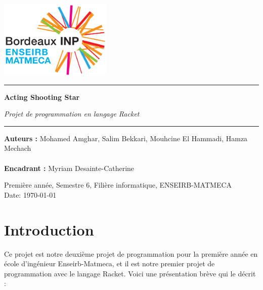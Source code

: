 \documentclass[a4paper]{article}
\begin{document}
\label{sec:title}
\thispagestyle{empty}

\noindent
\includegraphics[width=0.4\textwidth]{Pictures/ENSEIRB.png}




\noindent\rule{\textwidth}{1pt}
\begin{flushright}
  \Huge
  \textbf{ Acting Shooting Star }


  \large 
  \textsl{Projet de programmation en langage Racket}

\end{flushright}
\noindent\rule{\textwidth}{1pt}


\large
\noindent\textbf{Auteurs  : } \textup{Mohamed Amghar, Salim Bekkari, Mouhcine  El Hammadi, Hamza Mechach}\\ \\
\noindent\textbf{Encadrant :} \textup{Myriam Desainte-Catherine}


\normalsize





\begin{center}
  Première année, Semestre 6, Filière informatique, ENSEIRB-MATMECA\\
  Date: \today
\end{center}




\newpage
\tableofcontents
\pagebreak

\section{Introduction}
Ce projet est notre deuxième projet de programmation pour la première année en école d'ingénieur Enseirb-Matmeca, et il est notre premier projet de programmation avec le langage Racket. Voici une présentation brève qui le décrit :
\end{document}
